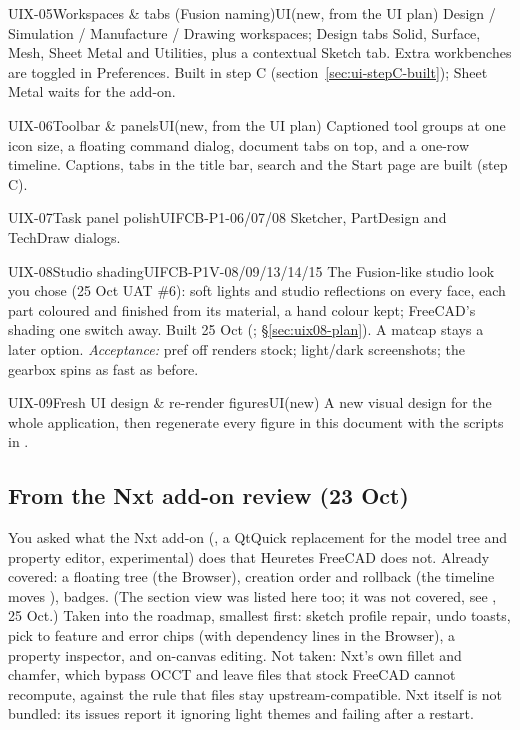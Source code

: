 
\begin{epic}{UIX-05}{Workspaces \& tabs (Fusion naming)}{UI}{\stProg}{(new, from the UI plan)}
Design / Simulation / Manufacture / Drawing workspaces; Design tabs Solid, Surface, Mesh, Sheet Metal and
Utilities, plus a contextual Sketch tab. Extra workbenches are toggled in Preferences. Built in step C
(section~\ref{sec:ui-stepC-built}); Sheet Metal waits for the add-on.
\end{epic}
\begin{epic}{UIX-06}{Toolbar \& panels}{UI}{\stProg}{(new, from the UI plan)}
Captioned tool groups at one icon size, a floating command dialog, document tabs on top, and a one-row timeline.
Captions, tabs in the title bar, search and the Start page are built (step C).
\end{epic}
\begin{epic}{UIX-07}{Task panel polish}{UI}{\stTodo}{FCB-P1-06/07/08}
Sketcher, PartDesign and TechDraw dialogs.
\end{epic}
\begin{epic}{UIX-08}{Studio shading}{UI}{\stDone}{FCB-P1V-08/09/13/14/15}
The Fusion-like studio look you chose (25 Oct UAT \#6): soft lights and studio reflections on every face, each part
coloured and finished from its material, a hand colour kept; FreeCAD's shading one switch away. Built 25 Oct
(; \S\ref{sec:uix08-plan}). A matcap stays a later option.
\emph{Acceptance:} pref off renders stock; light/dark screenshots; the gearbox spins as fast as before.
\end{epic}


\begin{epic}{UIX-09}{Fresh UI design \& re-render figures}{UI}{\stTodo}{(new)}
A new visual design for the whole application, then regenerate every figure in this document with the scripts
in .
\end{epic}

\subsection{From the Nxt add-on review (23 Oct)}\label{sec:uix-nxt}

You asked what the Nxt add-on (, a QtQuick replacement for the model tree
and property editor, experimental) does that Heuretes FreeCAD does not. Already covered: a floating tree (the Browser),
creation order and rollback (the timeline moves ), badges. (The section view was listed here too; it was not covered, see , 25 Oct.) Taken into the
roadmap, smallest first:  sketch profile repair,  undo toasts,  pick to
feature and error chips (with dependency lines in the Browser),  a property inspector, and
 on-canvas editing. Not taken: Nxt's own fillet and chamfer, which bypass OCCT and leave files that
stock FreeCAD cannot recompute, against the rule that files stay upstream-compatible. Nxt itself is not bundled:
its issues report it ignoring light themes and failing after a restart.

